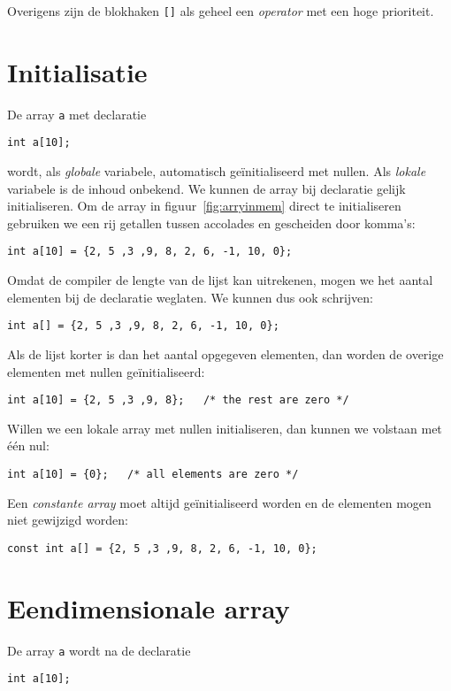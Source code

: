 Overigens zijn de blokhaken \texttt{[]} als geheel een \textsl{operator}\indexop{[]} met een hoge prioriteit.

\section{Initialisatie}
De array \texttt{a} met declaratie

\hspace*{1em}\texttt{int a[10];}

wordt, als \textsl{globale} variabele, automatisch geïnitialiseerd met nullen. Als \textsl{lokale} variabele is de inhoud onbekend.
We kunnen de array bij declaratie gelijk initialiseren. Om de array in figuur~\ref{fig:arryinmem} direct te initialiseren gebruiken we een rij getallen tussen accolades en gescheiden door komma's:

\hspace*{1em}\texttt{int a[10] = \{2, 5 ,3 ,9, 8, 2, 6, -1, 10, 0\};}

Omdat de compiler de lengte van de lijst kan uitrekenen, mogen we het aantal elementen bij de declaratie weglaten. We kunnen dus ook schrijven:

\hspace*{1em}\texttt{int a[] = \{2, 5 ,3 ,9, 8, 2, 6, -1, 10, 0\};}

Als de lijst korter is dan het aantal opgegeven elementen, dan worden de overige elementen met nullen geïnitialiseerd:

\hspace*{1em}\texttt{int a[10] = \{2, 5 ,3 ,9, 8\}; \ \ /* the rest are zero */} 

Willen we een lokale array met nullen initialiseren, dan kunnen we volstaan met één nul:

\hspace*{1em}\texttt{int a[10] = \{0\}; \ \ /* all elements are zero */} 

Een \textsl{constante array} moet altijd geïnitialiseerd worden en de elementen mogen niet gewijzigd worden:

\hspace*{1em}\texttt{const int a[] = \{2, 5 ,3 ,9, 8, 2, 6, -1, 10, 0\};}

\section{Eendimensionale array}
De array \texttt{a} wordt na de declaratie

\hspace*{1em}\texttt{int a[10];}

